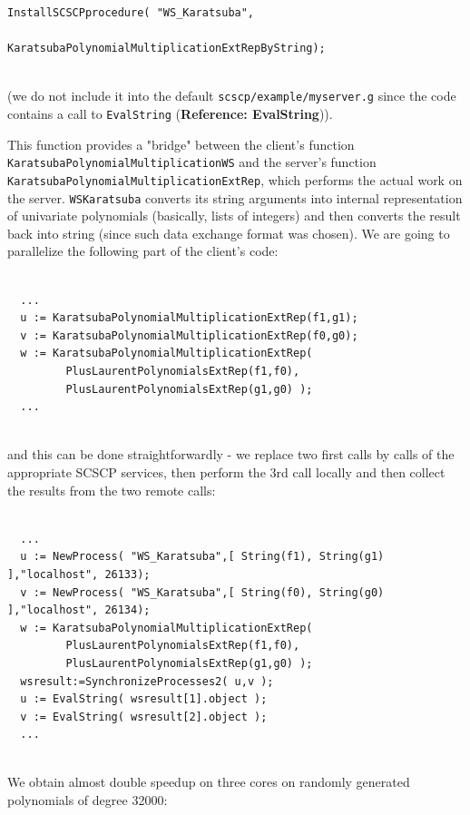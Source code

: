 \documentclass[a4paper,11pt]{report}
\begin{document}
{{\begin{Verbatim}[commandchars=!@|,fontsize=\small,frame=single,label=Example]
  InstallSCSCPprocedure( "WS_Karatsuba", 
                         KaratsubaPolynomialMultiplicationExtRepByString);
  
\end{Verbatim}
 (we do not include it into the default \texttt{scscp/example/myserver.g} since the code contains a call to \texttt{EvalString} (\textbf{Reference: EvalString})). 

 This function provides a "bridge" between the client's function \texttt{KaratsubaPolynomialMultiplicationWS} and the server's function \texttt{KaratsubaPolynomialMultiplicationExtRep}, which performs the actual work on the server. \texttt{WS{\textunderscore}Karatsuba} converts its string arguments into internal representation of univariate
polynomials (basically, lists of integers) and then converts the result back
into string (since such data exchange format was chosen).  \newpage  We are going to parallelize the following part of the client's code: 
\begin{Verbatim}[commandchars=!@|,fontsize=\small,frame=single,label=Example]
  
  ...
  u := KaratsubaPolynomialMultiplicationExtRep(f1,g1);
  v := KaratsubaPolynomialMultiplicationExtRep(f0,g0);
  w := KaratsubaPolynomialMultiplicationExtRep(
         PlusLaurentPolynomialsExtRep(f1,f0),
         PlusLaurentPolynomialsExtRep(g1,g0) );
  ...
  
\end{Verbatim}
 and this can be done straightforwardly - we replace two first calls by calls
of the appropriate \textsf{SCSCP} services, then perform the 3rd call locally and then collect the results from
the two remote calls: 
\begin{Verbatim}[commandchars=!@|,fontsize=\small,frame=single,label=Example]
  
  ...
  u := NewProcess( "WS_Karatsuba",[ String(f1), String(g1) ],"localhost", 26133);   
  v := NewProcess( "WS_Karatsuba",[ String(f0), String(g0) ],"localhost", 26134);   
  w := KaratsubaPolynomialMultiplicationExtRep(
         PlusLaurentPolynomialsExtRep(f1,f0),
         PlusLaurentPolynomialsExtRep(g1,g0) );
  wsresult:=SynchronizeProcesses2( u,v );
  u := EvalString( wsresult[1].object );
  v := EvalString( wsresult[2].object );
  ...
  
\end{Verbatim}
 We obtain almost double speedup on three cores on randomly generated
polynomials of degree 32000: 
\begin{Verbatim}[commandchars=!@|,fontsize=\small,frame=single,label=Example]
  

\end{Verbatim}}}
\end{document}
